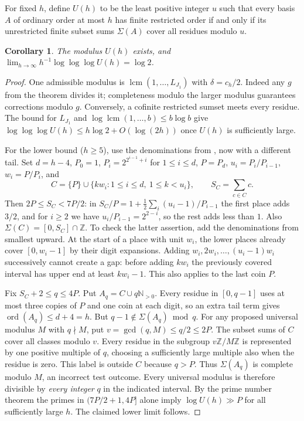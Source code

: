 \documentclass[11pt]{article}
\newtheorem{corollary}[theorem]{Corollary}
\newcommand{\N}{\mathbb N}
\newcommand{\Z}{\mathbb Z}
\newcommand{\ord}{\operatorname{ord}}
\DeclareMathOperator{\lcm}{lcm}
\begin{document}
For fixed $h$, define $U(h)$ to be the least positive integer $u$ such that every basis $A$ of ordinary order at most $h$ has finite restricted order if and only if its unrestricted finite subset sums $\Sigma(A)$ cover all residues modulo $u$.
\begin{corollary}
The modulus $U(h)$ exists, and $\displaystyle\lim_{h\to\infty}h^{-1}\log\log\log U(h)=\log 2$.
\end{corollary}
\begin{proof}
One admissible modulus is $\lcm(1,\ldots,L_{J_1})$ with $\delta=c_h/2$. Indeed any $g$ from the theorem divides it; completeness modulo the larger modulus guarantees corrections modulo $g$. Conversely, a cofinite restricted sumset meets every residue. The bound for $L_{J_1}$ and $\log\lcm(1,\ldots,b)\le b\log b$ give $\log\log\log U(h)\le h\log 2+O(\log(2h))$ once $U(h)$ is sufficiently large.

For the lower bound ($h\ge5$), use the denominations from \cite{Gao}, now with a different tail. Set $d=h-4$, $P_0=1$, $P_i=2^{2^{i-1}+i}$ for $1\le i\le d$, $P=P_d$, $u_i=P_i/P_{i-1}$, $w_i=P/P_i$, and
\[
 C=\{P\}\cup\{k w_i:1\le i\le d,\ 1\le k<u_i\},\qquad S_C=\sum_{c\in C}c .
\]
Then $2P\le S_C<7P/2$: in $S_C/P=1+\frac12\sum_i(u_i-1)/P_{i-1}$ the first place adds $3/2$, and for $i\ge2$ we have $u_i/P_{i-1}=2^{2-i}$, so the rest adds less than $1$. Also $\Sigma(C)=[0,S_C]\cap\Z$. To check the latter assertion, add the denominations from smallest upward. At the start of a place with unit $w_i$, the lower places already cover $[0,w_i-1]$ by their digit expansions. Adding $w_i,2w_i,\ldots,(u_i-1)w_i$ successively cannot create a gap: before adding $k w_i$ the previously covered interval has upper end at least $kw_i-1$. This also applies to the last coin $P$.

Fix $S_C+2\le q\le4P$. Put $A_q=C\cup q\N_{>0}$. Every residue in $[0,q-1]$ uses at most three copies of $P$ and one coin at each digit, so an extra tail term gives $\ord(A_q)\le d+4=h$. But $q-1\notin\Sigma(A_q)\bmod q$. For any proposed universal modulus $M$ with $q\nmid M$, put $v=\gcd(q,M)\le q/2\le2P$. The subset sums of $C$ cover all classes modulo $v$. Every residue in the subgroup $v\Z/M\Z$ is represented by one positive multiple of $q$, choosing a sufficiently large multiple also when the residue is zero. This label is outside $C$ because $q>P$. Thus $\Sigma(A_q)$ is complete modulo $M$, an incorrect test outcome. Every universal modulus is therefore divisible by \emph{every integer} $q$ in the indicated interval. By the prime number theorem the primes in $(7P/2+1,4P]$ alone imply $\log U(h)\gg P$ for all sufficiently large $h$. The claimed lower limit follows.
\end{proof}
\end{document}
